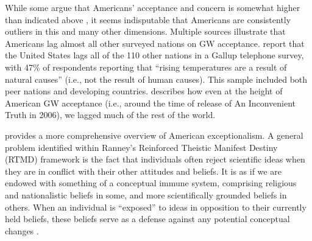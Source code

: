 While some argue that Americans' acceptance and concern is somewhat higher than
indicated above \parencite[e.g.,][report that 77\% of Americans “found human
activity responsible for warming” as of 2012]{krosnick_does_2013}, it seems
indisputable that Americans are consistently outliers in this and many other
dimensions.  Multiple sources illustrate that Americans lag almost all other
surveyed nations on GW acceptance.  \textcite{ray_worldwide_2010} report that
the United States lags all of the 110 other nations in a Gallup telephone
survey, with 47\% of respondents reporting that “rising temperatures are a
result of natural causes” (i.e., not the result of human causes). This sample
included both peer nations and developing countries.
\textcite{leiserowitz_international_2007} describes how even at the height of
American GW acceptance (i.e., around the time of release of An Inconvenient
Truth in 2006), we lagged much of the rest of the world.



\textcite{ranney_why_2012} provides a more comprehensive overview of American
exceptionalism.  A general problem identified within Ranney's Reinforced
Theistic Manifest Destiny (RTMD) framework is the fact that individuals often
reject scientific ideas when they are in conflict with their other attitudes and
beliefs. It is as if we are endowed with something of a conceptual immune system,
comprising religious and nationalistic beliefs in some, and more scientifically
grounded beliefs in others. When an individual is “exposed” to ideas in
opposition to their currently held beliefs, these beliefs serve as a defense
against any potential conceptual changes \parencite[as also discussed
by][]{shepherd_perpetuation_2012}.

